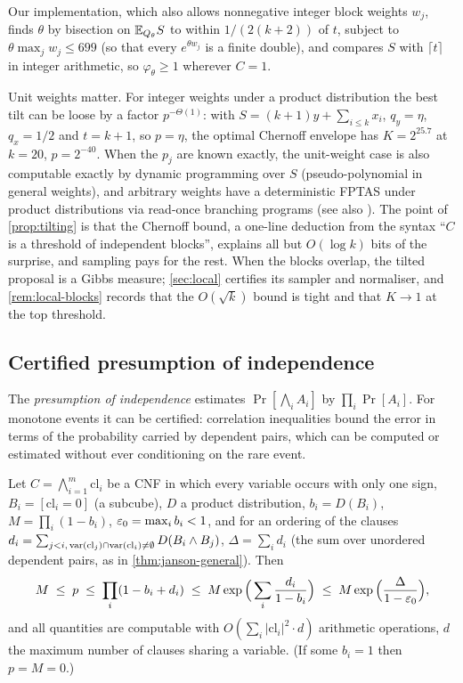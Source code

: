 Our implementation, which also allows nonnegative integer block weights $w_j$, finds
$\theta$ by bisection on $\mathbb{E}_{Q_\theta}S$ to within $1/(2(k+2))$ of $t$, subject to
$\theta\max_jw_j\le699$ (so that every $e^{\theta w_j}$ is a finite double), and compares
$S$ with $\lceil t\rceil$ in integer arithmetic, so $\varphi_\theta\ge1$ wherever $C=1$.

Unit weights matter. For integer weights under a product distribution the best
tilt can be loose by a factor $p^{-\Theta(1)}$: with
$S=(k+1)y+\sum_{i\le k}x_i$, $q_y=\eta$, $q_x=1/2$ and $t=k+1$, so $p=\eta$, the
optimal Chernoff envelope has $K=2^{25.7}$ at $k=20$, $p=2^{-40}$. When the $p_j$ are
known exactly, the unit-weight case is also computable exactly by dynamic
programming over $S$ (pseudo-polynomial in general weights), and arbitrary weights
have a deterministic FPTAS under product distributions via read-once branching programs
\cite{gkm2010} (see also \cite{gopalan2011fptas}). The point of
\cref{prop:tilting} is that the Chernoff bound, a one-line deduction from the syntax
``$C$ is a threshold of independent blocks'', explains all but $O(\log k)$ bits of the
surprise, and sampling pays for the rest. When the blocks overlap, the tilted proposal is
a Gibbs measure; \cref{sec:local} certifies its sampler and normaliser, and
\cref{rem:local-blocks} records that the $O(\sqrt k)$ bound is tight and that $K\to1$
at the top threshold.

\subsection{Certified presumption of independence}\label{sec:janson}

The \emph{presumption of independence} \cite{christiano2022presumption}
estimates $\Pr[\bigwedge_iA_i]$ by $\prod_i\Pr[A_i]$. For monotone events it can
be certified: correlation inequalities bound the error in terms of the
probability carried by dependent pairs, which can be computed or estimated
without ever conditioning on the rare event.

\begin{theorem}\label{thm:janson}
Let $C=\bigwedge_{i=1}^m\mathrm{cl}_i$ be a CNF in which every variable occurs
with only one sign, $B_i=[\mathrm{cl}_i=0]$ (a subcube), $D$ a product
distribution, $b_i=D(B_i)$, $M=\prod_i(1-b_i)$, $\varepsilon_0=\max_ib_i<1$, and for an
ordering of the clauses $d_i=\sum_{j<i,\,\mathrm{var}(\mathrm{cl}_j)\cap\mathrm{var}(\mathrm{cl}_i)\ne\emptyset}D(B_i\wedge B_j)$,
$\Delta=\sum_id_i$ (the sum over unordered dependent pairs, as in
\cref{thm:janson-general}). Then
\[
M\;\le\;p\;\le\;\prod_i(1-b_i+d_i)\;\le\;M\exp\Big(\sum_i\frac{d_i}{1-b_i}\Big)\;\le\;M\exp\Big(\frac{\Delta}{1-\varepsilon_0}\Big),
\]
and all quantities are computable with $O(\sum_i|\mathrm{cl}_i|^2\cdot d)$ arithmetic
operations, $d$ the maximum number of clauses sharing a variable. (If some
$b_i=1$ then $p=M=0$.)
\end{theorem}


